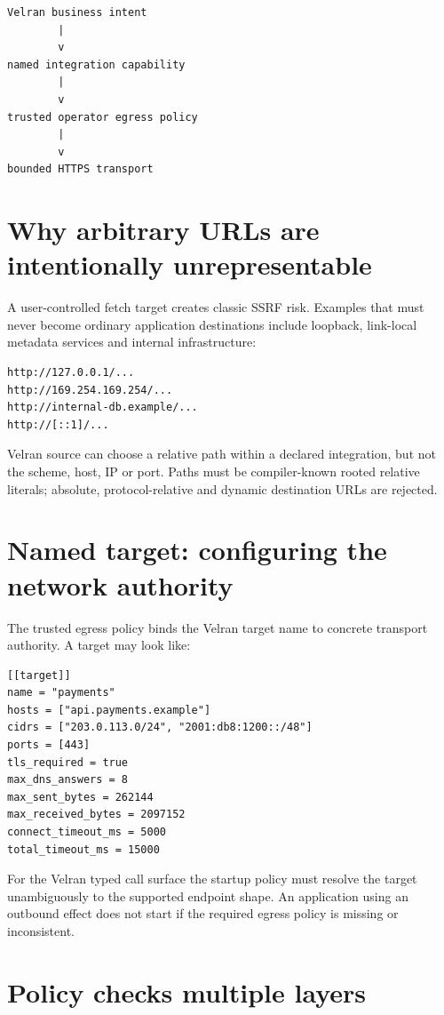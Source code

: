 \begin{lstlisting}
Velran business intent
        |
        v
named integration capability
        |
        v
trusted operator egress policy
        |
        v
bounded HTTPS transport
\end{lstlisting}

\section{Why arbitrary URLs are intentionally unrepresentable}

A user-controlled fetch target creates classic SSRF risk. Examples that must never become ordinary application destinations include loopback, link-local metadata services and internal infrastructure:

\begin{lstlisting}
http://127.0.0.1/...
http://169.254.169.254/...
http://internal-db.example/...
http://[::1]/...
\end{lstlisting}

Velran source can choose a relative path within a declared integration, but not the scheme, host, IP or port. Paths must be compiler-known rooted relative literals; absolute, protocol-relative and dynamic destination URLs are rejected.

\section{Named target: configuring the network authority}

The trusted egress policy binds the Velran target name to concrete transport authority. A target may look like:

\begin{lstlisting}
[[target]]
name = "payments"
hosts = ["api.payments.example"]
cidrs = ["203.0.113.0/24", "2001:db8:1200::/48"]
ports = [443]
tls_required = true
max_dns_answers = 8
max_sent_bytes = 262144
max_received_bytes = 2097152
connect_timeout_ms = 5000
total_timeout_ms = 15000
\end{lstlisting}

For the Velran typed call surface the startup policy must resolve the target unambiguously to the supported endpoint shape. An application using an outbound effect does not start if the required egress policy is missing or inconsistent.

\section{Policy checks multiple layers}

